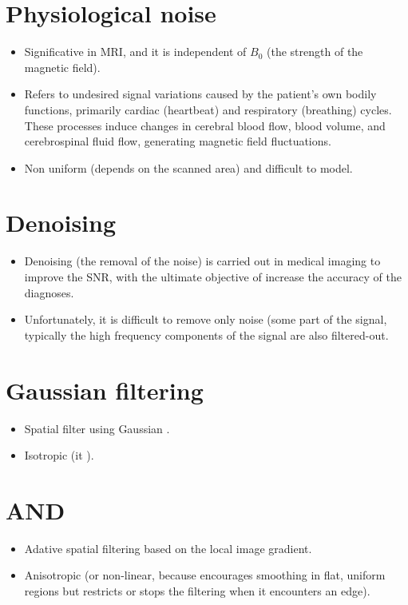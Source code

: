 \section{Physiological noise}
\begin{itemize}
\item Significative in \gls{MRI}, and it is independent of $B_0$ (the
  strength of the magnetic field).
\item Refers to undesired signal variations caused by the patient's
  own bodily functions, primarily cardiac (heartbeat) and respiratory
  (breathing) cycles. These processes induce changes in cerebral blood
  flow, blood volume, and cerebrospinal fluid flow, generating
  magnetic field fluctuations.
\item Non uniform (depends on the scanned area) and difficult to model.
\end{itemize}

\section{Denoising}
\begin{itemize}
\item Denoising (the removal of the noise) is carried out in
  medical imaging to improve the \gls{SNR}, with the ultimate
  objective of increase the accuracy of the diagnoses.
\item Unfortunately, it is difficult to remove only noise (some part
  of the signal, typically the high frequency components of the signal
  are also filtered-out.
\end{itemize}

\section{Gaussian filtering}
\begin{itemize}
\item Spatial filter using Gaussian .
\item Isotropic (it ).
\end{itemize}

\section{\gls{AND}}
\begin{itemize}
\item Adative spatial filtering based on the local image gradient.
\item Anisotropic (or non-linear, because encourages smoothing in
  flat, uniform regions but restricts or stops the filtering when it
  encounters an edge).
\end{itemize}

